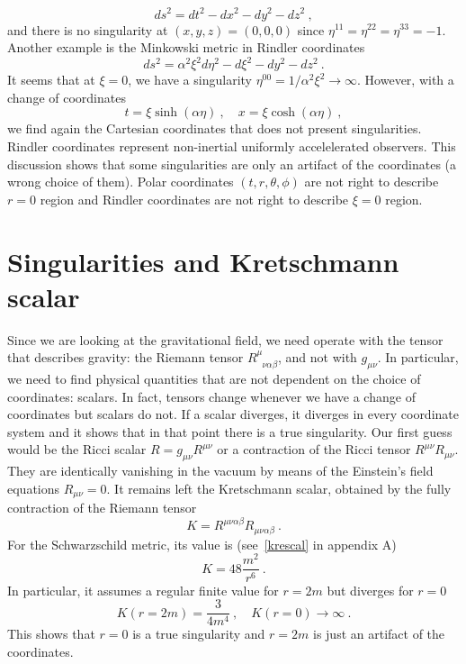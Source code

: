     \begin{equation*}
        ds^2 = dt^2 - dx^2 - dy^2 - dz^2 ~,
    \end{equation*}
    and there is no singularity at $(x,y,z) = (0,0,0)$ since $\eta^{11} = \eta^{22} = \eta^{33} = -1$. Another example is the Minkowski metric in Rindler coordinates 
    \begin{equation*}
        ds^2 = \alpha^2 \xi^2 d\eta^2 - d\xi^2 - dy^2 - dz^2 ~.
    \end{equation*}
    It seems that at $\xi = 0$, we have a singularity $\eta^{00} = 1 / \alpha^2 \xi^2 \rightarrow \infty$. However, with a change of coordinates   
    \begin{equation*}
        t = \xi \sinh(\alpha \eta) ~, \quad x = \xi \cosh (\alpha \eta) ~,
    \end{equation*}
    we find again the Cartesian coordinates that does not present singularities. Rindler coordinates represent non-inertial uniformly accelelerated observers. This discussion shows that some singularities are only an artifact of the coordinates (a wrong choice of them). Polar coordinates $(t,r,\theta,\phi)$ are not right to describe $r=0$ region and Rindler coordinates are not right to describe $\xi = 0$ region.

\section{Singularities and Kretschmann scalar}

    Since we are looking at the gravitational field, we need operate with the tensor that describes gravity: the Riemann tensor $R^{\mu}_{\phantom \mu \nu\alpha\beta}$, and not with $g_{\mu\nu}$. In particular, we need to find physical quantities that are not dependent on the choice of coordinates: scalars. In fact, tensors change whenever we have a change of coordinates but scalars do not. If a scalar diverges, it diverges in every coordinate system and it shows that in that point there is a true singularity. Our first guess would be the Ricci scalar $R = g_{\mu\nu} R^{\mu\nu}$ or a contraction of the Ricci tensor $R^{\mu\nu} R_{\mu\nu}$. They are identically vanishing in the vacuum by means of the Einstein's field equations $R_{\mu\nu} = 0$. It remains left the Kretschmann scalar, obtained by the fully contraction of the Riemann tensor 
    \begin{equation*}
        K = R^{\mu\nu\alpha\beta} R_{\mu\nu\alpha\beta} ~.
    \end{equation*}
    For the Schwarzschild metric, its value is (see~\eqref{krescal} in appendix A)
    \begin{equation*}
        K = 48 \frac{m^2}{r^6} ~.
    \end{equation*}
    In particular, it assumes a regular finite value for $r=2m$ but diverges for $r=0$
    \begin{equation*}
        K(r=2m) = \frac{3}{4 m^4} ~, \quad K(r=0) \rightarrow \infty ~.
    \end{equation*}
    This shows that $r=0$ is a true singularity and $r=2m$ is just an artifact of the coordinates.

